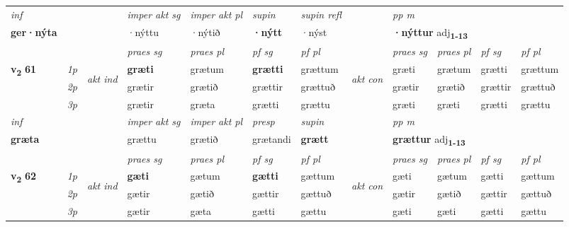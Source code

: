 \begin{longtable}[l]{X>{\footnotesize\itshape}llXXXXlXXXX}
   {\textit{inf}} & &  & \textit{imper akt sg} & \textit{imper akt pl}    & \textit{supin} & \textit{supin refl} && \textit{pp m} \\*
  {\textbf{ger\allowbreak ·nýta}} & && ·nýttu  & ·nýtið    &  \textbf{·nýtt} & ·nýst && \multicolumn{2}{l}{\textbf{·nýttur} adj\textbf{\textsubscript{1-13}}} \\*

\midrule

 & &   & \textit{praes sg}  & \textit{praes pl}    & \textit{ pf sg} & \textit{pf pl} & & \textit{praes sg}  & \textit{praes pl}    & \textit{pf sg} & \textit{pf pl }  \\ \cmidrule{4-7} \cmidrule{9-12}
 \multirow{2}{*}{{{\textbf{v{\textsubscript{2}}} \Large{\textbf{61}}}}}  & 1p & \multirow{3}{*}{\begin{turn}{90}\textit{akt ind}\end{turn}} & \textbf{græti} & grætum & \textbf{grætti} & grættum & \multirow{3}{*}{\begin{turn}{90}\textit{akt con}\end{turn}} &græti & grætum & grætti & grættum\\*
 & 2p &  &  grætir  & grætið & grættir & grættuð & & grætir & grætið & grættir & grættuð \\*
 & 3p &  & grætir & græta & grætti & grættu & & græti & græti& grætti & grættu \\*
\cmidrule{4-7} \cmidrule{9-12}

   {\textit{inf}} & &  & \textit{imper akt sg} & \textit{imper akt pl}   & \textit{presp} & \textit{supin}  && \textit{pp m} \\*
  {\textbf{græta}} & && grættu  & grætið   & grætandi &  \textbf{grætt}  && \multicolumn{2}{l}{\textbf{grættur} adj\textbf{\textsubscript{1-13}}} \\*

\midrule

\midrule
 & &   & \textit{praes sg}  & \textit{praes pl}    & \textit{ pf sg} & \textit{pf pl} & & \textit{praes sg}  & \textit{praes pl}    & \textit{pf sg} & \textit{pf pl }  \\ \cmidrule{4-7} \cmidrule{9-12}
 \multirow{2}{*}{{{\textbf{v{\textsubscript{2}}} \Large{\textbf{62}}}}}  & 1p & \multirow{3}{*}{\begin{turn}{90}\textit{akt ind}\end{turn}} & \textbf{gæti} & gætum & \textbf{gætti} & gættum & \multirow{3}{*}{\begin{turn}{90}\textit{akt con}\end{turn}} &gæti & gætum & gætti & gættum\\*
 & 2p &  &  gætir  & gætið & gættir & gættuð & & gætir & gætið & gættir & gættuð \\*
 & 3p &  & gætir & gæta & gætti & gættu & & gæti & gæti& gætti & gættu \\*
\cmidrule{4-7} \cmidrule{9-12}


\end{longtable}

